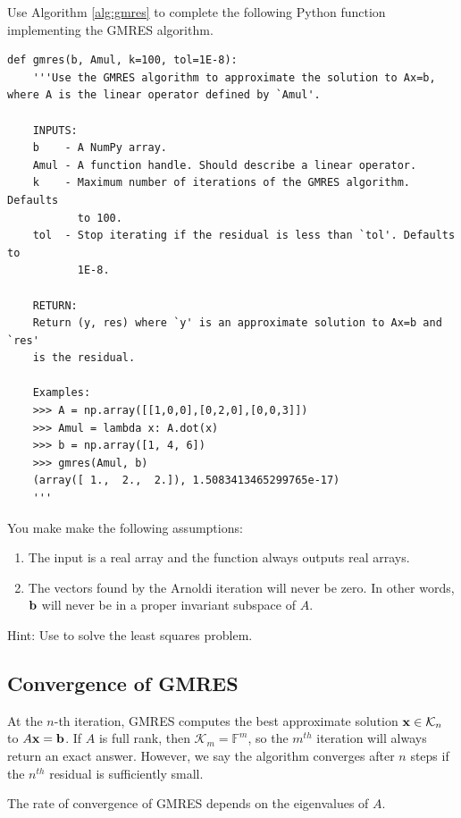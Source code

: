 \begin{problem}
Use Algorithm \ref{alg:gmres} to complete the following Python function implementing the GMRES algorithm.
\begin{lstlisting}
def gmres(b, Amul, k=100, tol=1E-8):
    '''Use the GMRES algorithm to approximate the solution to Ax=b, where A is the linear operator defined by `Amul'.
    
    INPUTS:
    b    - A NumPy array.
    Amul - A function handle. Should describe a linear operator.
    k    - Maximum number of iterations of the GMRES algorithm. Defaults 
           to 100.
    tol  - Stop iterating if the residual is less than `tol'. Defaults to 
           1E-8.
    
    RETURN:
    Return (y, res) where `y' is an approximate solution to Ax=b and `res' 
    is the residual.
    
    Examples:
    >>> A = np.array([[1,0,0],[0,2,0],[0,0,3]])
    >>> Amul = lambda x: A.dot(x)
    >>> b = np.array([1, 4, 6])
    >>> gmres(Amul, b)
    (array([ 1.,  2.,  2.]), 1.5083413465299765e-17)
    '''
\end{lstlisting}
You make make the following assumptions:
\begin{enumerate}
\item The input  is a real array and the function  always outputs real arrays.
\item The vectors found by the Arnoldi iteration will never be zero. In other words, ${\bf b}$ will never be in a proper invariant subspace of $A$.
\end{enumerate}

Hint: Use  to solve the least squares problem.
\label{prob:MyGMRES}
\end{problem}



\subsection*{Convergence of GMRES}
At the $n$-th iteration, GMRES computes the best approximate solution ${\bf x} \in \mathcal{K}_n$ to $A{\bf x} = {\bf b}$.
If $A$ is full rank, then $\mathcal{K}_m = \mathbb{F}^m$, so the $m^{th}$ iteration will always return an exact answer.
However, we say the algorithm converges after $n$ steps if the $n^{th}$ residual is sufficiently small.

The rate of convergence of GMRES depends on the eigenvalues of $A$.

